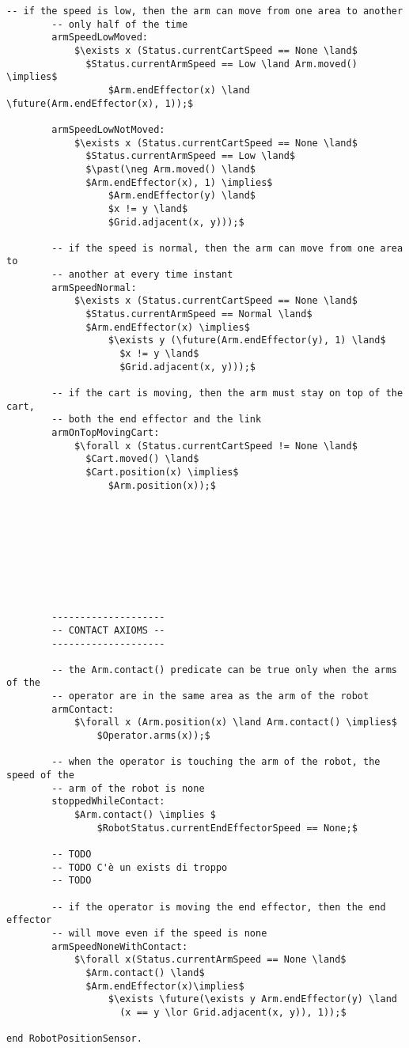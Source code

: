 \begin{lstlisting}[fontadjust, mathescape, frame=single]
        -- if the speed is low, then the arm can move from one area to another
        -- only half of the time
        armSpeedLowMoved: 
            $\exists x (Status.currentCartSpeed == None \land$
              $Status.currentArmSpeed == Low \land Arm.moved() \implies$ 
                  $Arm.endEffector(x) \land \future(Arm.endEffector(x), 1));$

        armSpeedLowNotMoved: 
            $\exists x (Status.currentCartSpeed == None \land$
              $Status.currentArmSpeed == Low \land$ 
              $\past(\neg Arm.moved() \land$
              $Arm.endEffector(x), 1) \implies$ 
                  $Arm.endEffector(y) \land$
                  $x != y \land$ 
                  $Grid.adjacent(x, y)));$

        -- if the speed is normal, then the arm can move from one area to 
        -- another at every time instant
        armSpeedNormal: 
            $\exists x (Status.currentCartSpeed == None \land$
              $Status.currentArmSpeed == Normal \land$
              $Arm.endEffector(x) \implies$
                  $\exists y (\future(Arm.endEffector(y), 1) \land$
                    $x != y \land$
                    $Grid.adjacent(x, y)));$

        -- if the cart is moving, then the arm must stay on top of the cart,
        -- both the end effector and the link
        armOnTopMovingCart: 
            $\forall x (Status.currentCartSpeed != None \land$
              $Cart.moved() \land$ 
              $Cart.position(x) \implies$
                  $Arm.position(x));$









        --------------------
        -- CONTACT AXIOMS --
        --------------------

        -- the Arm.contact() predicate can be true only when the arms of the 
        -- operator are in the same area as the arm of the robot
        armContact:
            $\forall x (Arm.position(x) \land Arm.contact() \implies$
                $Operator.arms(x));$

        -- when the operator is touching the arm of the robot, the speed of the
        -- arm of the robot is none
        stoppedWhileContact:
            $Arm.contact() \implies $
                $RobotStatus.currentEndEffectorSpeed == None;$

        -- TODO
        -- TODO C'è un exists di troppo
        -- TODO
                
        -- if the operator is moving the end effector, then the end effector 
        -- will move even if the speed is none
        armSpeedNoneWithContact: 
            $\forall x(Status.currentArmSpeed == None \land$
              $Arm.contact() \land$
              $Arm.endEffector(x)\implies$
                  $\exists \future(\exists y Arm.endEffector(y) \land 
                    (x == y \lor Grid.adjacent(x, y)), 1));$
        
end RobotPositionSensor.
\end{lstlisting}